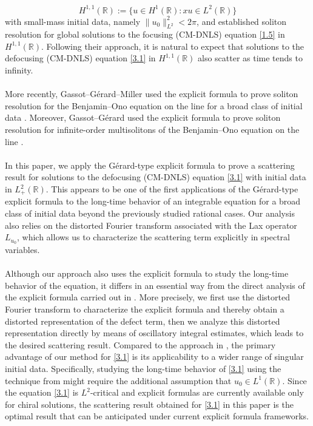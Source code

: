 \documentclass[10pt]{article}
\numberwithin{equation}{section}
\numberwithin{theorem}{section}
\begin{document}
\[
H^{1,1}(\mathbb{R}):=\{u\in H^1(\mathbb{R}): xu\in L^2(\mathbb{R})\}
\]
with small-mass initial data, namely $\|u_0\|_{L^2}^2<2\pi$, and established soliton resolution for global solutions to the focusing (CM-DNLS) equation \eqref{1.5} in $H^{1,1}(\mathbb{R})$. Following their approach, it is natural to expect that solutions to the defocusing (CM-DNLS) equation \eqref{3.1} in $H^{1,1}(\mathbb{R})$ also scatter as time tends to infinity.\\\\
More recently, Gassot--G\'erard--Miller used the explicit formula to prove soliton resolution for the Benjamin--Ono equation on the line for a broad class of initial data \cite{0}. Moreover, Gassot--G\'erard used the explicit formula to prove soliton resolution for infinite-order multisolitons of the Benjamin--Ono equation on the line \cite{0.1}.\\\\
In this paper, we apply the G\'erard-type explicit formula to prove a scattering result for solutions to the defocusing (CM-DNLS) equation \eqref{3.1} with initial data in $L_+^2(\mathbb{R})$. This appears to be one of the first applications of the G\'erard-type explicit formula to the long-time behavior of an integrable equation for a broad class of initial data beyond the previously studied rational cases. Our analysis also relies on the distorted Fourier transform associated with the Lax operator $L_{u_0}$, which allows us to characterize the scattering term explicitly in spectral variables.\\\\
Although our approach also uses the explicit formula to study the long-time behavior of the equation, it differs in an essential way from the direct analysis of the explicit formula carried out in \cite{0}. More precisely, we first use the distorted Fourier transform to characterize the explicit formula and thereby obtain a distorted representation of the defect term, then we analyze this distorted representation directly by means of oscillatory integral estimates, which leads to the desired scattering result. Compared to the approach in \cite{0}, the primary advantage of our method for \eqref{3.1} is its applicability to a wider range of singular initial data. Specifically, studying the long-time behavior of \eqref{3.1} using the technique from \cite{0} might require the additional assumption that $u_0 \in L^1(\mathbb R)$. Since the equation \eqref{3.1} is $L^2$-critical and explicit formulas are currently available only for chiral solutions, the scattering result obtained for \eqref{3.1} in this paper is the optimal result that can be anticipated under current explicit formula frameworks.
\end{document}
